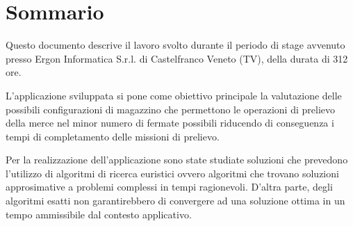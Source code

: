 \cleardoublepage
{}
{}
\begingroup
\let\clearpage\relax
\let\cleardoublepage\relax
\let\cleardoublepage\relax

\chapter*{Sommario}

Questo documento descrive il lavoro svolto durante il periodo di stage avvenuto presso Ergon Informatica S.r.l. di 
Castelfranco Veneto (TV), della durata di 312 ore.

L’applicazione sviluppata si pone come obiettivo principale la valutazione delle possibili configurazioni di magazzino che permettono le
operazioni di prelievo della merce nel minor numero di fermate possibili riducendo di conseguenza i tempi di completamento delle 
missioni di prelievo.

Per la realizzazione dell'applicazione sono state studiate soluzioni che prevedono l'utilizzo di algoritmi di ricerca
euristici ovvero algoritmi che trovano soluzioni approsimative a problemi complessi in tempi ragionevoli.
D'altra parte, degli algoritmi esatti non garantirebbero di convergere ad una soluzione ottima in un tempo
ammissibile dal contesto applicativo.




\endgroup

\vfill

